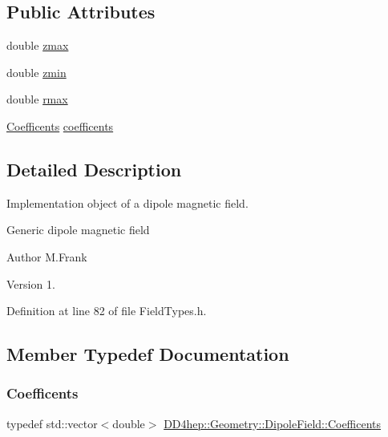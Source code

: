 \subsection*{Public Attributes}
\begin{DoxyCompactItemize}
\item 
double \hyperlink{class_d_d4hep_1_1_geometry_1_1_dipole_field_acc7b4e9b6fac44800ef4f37f65adaefd}{zmax}
\item 
double \hyperlink{class_d_d4hep_1_1_geometry_1_1_dipole_field_a871a5339aaac0458cf912b44317d5eed}{zmin}
\item 
double \hyperlink{class_d_d4hep_1_1_geometry_1_1_dipole_field_a554269ad195ae2b4741fb0df32729168}{rmax}
\item 
\hyperlink{class_d_d4hep_1_1_geometry_1_1_dipole_field_a0e17be76b199f0f144624e6a5eb1f030}{Coefficents} \hyperlink{class_d_d4hep_1_1_geometry_1_1_dipole_field_ae24ace99bfcc72927cd83cf1aede76a9}{coefficents}
\end{DoxyCompactItemize}


\subsection{Detailed Description}
Implementation object of a dipole magnetic field. 

Generic dipole magnetic field

\begin{DoxyAuthor}{Author}
M.\+Frank 
\end{DoxyAuthor}
\begin{DoxyVersion}{Version}
1. 
\end{DoxyVersion}


Definition at line 82 of file Field\+Types.\+h.



\subsection{Member Typedef Documentation}
\hypertarget{class_d_d4hep_1_1_geometry_1_1_dipole_field_a0e17be76b199f0f144624e6a5eb1f030}{}\label{class_d_d4hep_1_1_geometry_1_1_dipole_field_a0e17be76b199f0f144624e6a5eb1f030} 
\subsubsection{\texorpdfstring{Coefficents}{Coefficents}}
{\footnotesize\ttfamily typedef std\+::vector$<$double$>$ \hyperlink{class_d_d4hep_1_1_geometry_1_1_dipole_field_a0e17be76b199f0f144624e6a5eb1f030}{D\+D4hep\+::\+Geometry\+::\+Dipole\+Field\+::\+Coefficents}}



